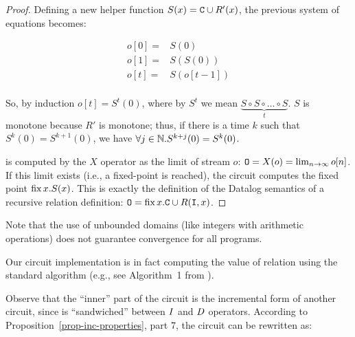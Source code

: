 \begin{proof}
Defining a new helper function $S(x) = \mbox{\texttt{C}} \cup R'(x)$, the previous system of equations becomes:

$$
\begin{aligned}
o[0] =& S(0) \\
o[1] =& S(S(0)) \\
o[t] =& S(o[t-1]) \\
\end{aligned}
$$ 

So, by induction $o[t] = S^t(0)$, where by $S^t$ we mean $\underbrace{S \circ S \circ \ldots \circ S}_{t}$.
$S$ is monotone because $R'$ is monotone; thus, if there is a time $k$ such that $S^k(0) = S^{k+1}(0)$, we have 
$\forall j \in \mathbb{N} . S^{k+j}(0) = S^k(0)$.  

 is computed by the $X$ operator as the limit of stream $o$:
$\mbox{\texttt{O}} = X(o) = \lim_{n \to \infty} o[n]$.  If this limit exists (i.e., a fixed-point
is reached), the circuit computes the fixed point $\mbox{fix}\,x.S(x)$.  This is exactly
the definition of the Datalog semantics of a recursive relation definition: $\mbox{\texttt{O}} = 
\mbox{fix}\,x.\mbox{\texttt{C}} \cup R(\mbox{\texttt{I}}, x)$.
\end{proof}

Note that the use of unbounded domains (like integers with arithmetic operations) does 
not guarantee convergence for all programs.

Our circuit implementation is in fact computing the value of relation  using the standard
 algorithm (e.g., see Algorithm~1 from \cite{greco-sldm15}).

Observe that the ``inner'' part of the circuit is the incremental
form of another circuit, since is ``sandwiched'' between $\mathit{I}$ and $\mathit{D}$ operators.
According to Proposition~\ref{prop-inc-properties}, part 7, the circuit can be
rewritten as:

\begin{center}
\end{center}

